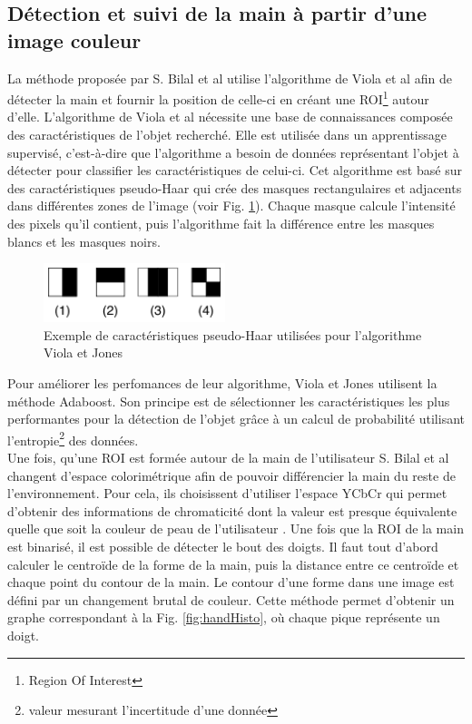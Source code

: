 \subsection{Détection et suivi de la main à partir d'une image couleur}
La méthode proposée par S. Bilal et al \cite{haarlike} utilise l'algorithme de Viola et al \cite{viola2001jones} afin
de détecter la main et fournir la position de celle-ci en créant une ROI\footnote{Region Of Interest} autour d'elle.
L'algorithme de Viola et al \cite{viola2001jones} nécessite une 
base de connaissances composée des caractéristiques de l'objet recherché. Elle est utilisée dans un 
apprentissage supervisé, c'est-à-dire que l'algorithme a besoin de données représentant
l'objet à détecter pour classifier les caractéristiques de celui-ci. Cet algorithme est basé sur des caractéristiques 
pseudo-Haar qui crée des masques rectangulaires et adjacents dans différentes zones de l'image (voir Fig. \ref{fig:pseudo_haar}). 
Chaque masque calcule l'intensité des pixels qu'il contient, puis l'algorithme fait la différence entre les masques blancs et 
les masques noirs.\\

\begin{figure}[!h]
\center
\includegraphics[width=200px]{images/pseudo_haar.png}
\caption{Exemple de caractéristiques pseudo-Haar utilisées pour l'algorithme Viola et Jones}
\label{fig:pseudo_haar}
\end{figure}

Pour améliorer les perfomances de leur algorithme, Viola et Jones utilisent la méthode Adaboost. Son
principe est de sélectionner les caractéristiques les plus performantes pour la détection de l'objet grâce à
un calcul de probabilité utilisant l'entropie\footnote{valeur mesurant l'incertitude d'une donnée} des données.\\

Une fois, qu'une ROI est formée autour de la main de l'utilisateur S. Bilal et al \cite{haarlike} changent d'espace colorimétrique
afin de pouvoir différencier la main du reste de l'environnement. Pour cela, ils choisissent 
d'utiliser l'espace YCbCr qui permet d'obtenir des informations de chromaticité dont la valeur est presque équivalente
quelle que soit la couleur de peau de l'utilisateur \cite{yoo1999fast}. Une fois que la ROI de la main est binarisé, il est possible
de détecter le bout des doigts. Il faut tout d'abord calculer le centroïde de la forme de la main, puis la distance entre
ce centroïde et chaque point du contour de la main. Le contour d'une forme dans une image est défini par un changement brutal
de couleur. Cette méthode permet d'obtenir un graphe correspondant à la Fig. \ref{fig:handHisto}, où chaque pique représente un doigt.

